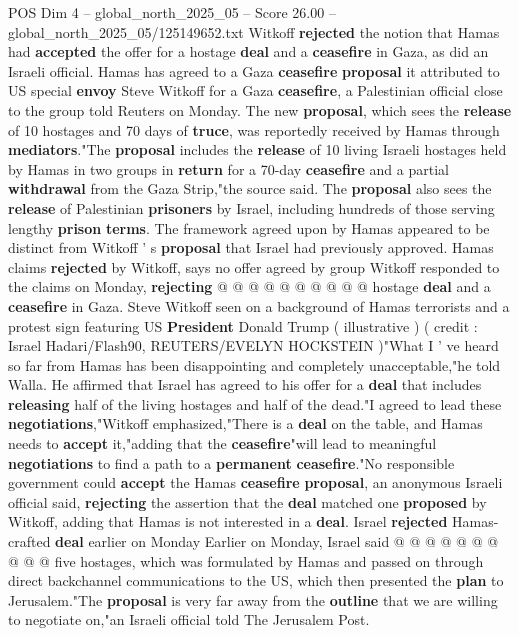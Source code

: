 \begin{textsample}{POS Dim 4 – global\_north\_2025\_05 – Score 26.00 – global\_north\_2025\_05/125149652.txt}  \label{ex:f4_pos_194}
Witkoff \textbf{rejected} the notion that Hamas had \textbf{accepted} the offer for a hostage \textbf{deal} and a \textbf{ceasefire} in Gaza, as did an Israeli official.
Hamas has agreed to a Gaza \textbf{ceasefire} \textbf{proposal} it attributed to US special \textbf{envoy} Steve Witkoff for a Gaza \textbf{ceasefire}, a Palestinian official close to the group told Reuters on Monday.
The new \textbf{proposal}, which sees the \textbf{release} of 10 hostages and 70 days of \textbf{truce}, was reportedly received by Hamas through \textbf{mediators}."The \textbf{proposal} includes the \textbf{release} of 10 living Israeli hostages held by Hamas in two groups in \textbf{return} for a 70-day \textbf{ceasefire} and a partial \textbf{withdrawal} from the Gaza Strip,"the source said.
The \textbf{proposal} also sees the \textbf{release} of Palestinian \textbf{prisoners} by Israel, including hundreds of those serving lengthy \textbf{prison} \textbf{terms}.
The framework agreed upon by Hamas appeared to be distinct from Witkoff ' s \textbf{proposal} that Israel had previously approved.
Hamas claims \textbf{rejected} by Witkoff, says no offer agreed by group Witkoff responded to the claims on Monday, \textbf{rejecting} @ @ @ @ @ @ @ @ @ @ hostage \textbf{deal} and a \textbf{ceasefire} in Gaza.
Steve Witkoff seen on a background of Hamas terrorists and a protest sign featuring US \textbf{President} Donald Trump ( illustrative ) ( credit : Israel Hadari/Flash90, REUTERS/EVELYN HOCKSTEIN )"What I ' ve heard so far from Hamas has been disappointing and completely unacceptable,"he told Walla.
He affirmed that Israel has agreed to his offer for a \textbf{deal} that includes \textbf{releasing} half of the living hostages and half of the dead."I agreed to lead these \textbf{negotiations},"Witkoff emphasized,"There is a \textbf{deal} on the table, and Hamas needs to \textbf{accept} it,"adding that the \textbf{ceasefire}"will lead to meaningful \textbf{negotiations} to find a path to a \textbf{permanent} \textbf{ceasefire}."No responsible government could \textbf{accept} the Hamas \textbf{ceasefire} \textbf{proposal}, an anonymous Israeli official said, \textbf{rejecting} the assertion that the \textbf{deal} matched one \textbf{proposed} by Witkoff, adding that Hamas is not interested in a \textbf{deal}.
Israel \textbf{rejected} Hamas-crafted \textbf{deal} earlier on Monday Earlier on Monday, Israel said @ @ @ @ @ @ @ @ @ @ five hostages, which was formulated by Hamas and passed on through direct backchannel communications to the US, which then presented the \textbf{plan} to Jerusalem."The \textbf{proposal} is very far away from the \textbf{outline} that we are willing to negotiate on,"an Israeli official told The Jerusalem Post.

\end{textsample}
